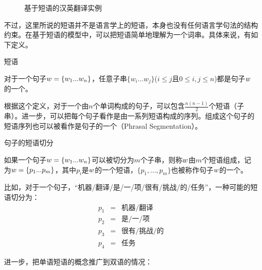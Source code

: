 \begin{figure}[htp]
\centering

\caption{基于短语的汉英翻译实例}
\label{fig:7-6}
\end{figure}

\parinterval 不过，这里所说的短语并不是语言学上的短语，本身也没有任何语言学句法的结构约束。在基于短语的模型中，可以把短语简单地理解为一个词串。具体来说，有如下定义。

\vspace{0.5em}
\begin{definition} 短语

{\small
对于一个句子${w} = \{ w_1...w_n \} $，任意子串$\{ w_i...w_j\}$($i\leq j$且$0\leq i,j\leq n$)都是句子${w}$的一个{\small{}}。
}
\end{definition}

\parinterval 根据这个定义，对于一个由$n$个单词构成的句子，可以包含$\frac{n(n-1)}{2}$个短语（子串）。进一步，可以把每个句子看作是由一系列短语构成的序列。组成这个句子的短语序列也可以被看作是句子的一个{\small{}}（Phrasal Segmentation）。

\vspace{0.5em}
\begin{definition} 句子的短语切分

{\small
如果一个句子${w} = \{ w_1...w_n\}$可以被切分为$m$个子串，则称${w}$由$m$个短语组成，记为${w} =\{ p_1...p_m \} $，其中$p_i$是${w}$的一个短语，$\{p_1,...,p_m\}$也被称作句子${w}$的一个{\small{}}。
}
\end{definition}

\parinterval 比如，对于一个句子，“机器/翻译/是/一/项/很有/挑战/的/任务”，一种可能的短语切分为：
\begin{eqnarray}
p_1 &=& \text{机器}/\text{翻译} \nonumber \\
p_2 &=& \text{是}/\text{一}/\text{项} \nonumber \\
p_3 &=& \text{很有}/\text{挑战}/\text{的} \nonumber \\
p_4 &=& \text{任务}\nonumber
\end{eqnarray}

\parinterval 进一步，把单语短语的概念推广到双语的情况：

